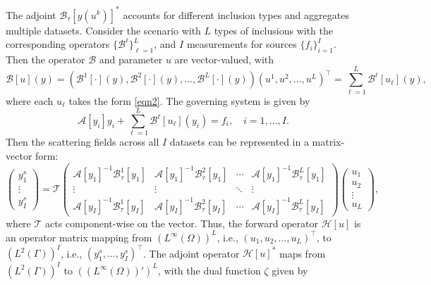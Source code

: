 \documentclass[onefignum,onetabnum]{siamart190516}
\numberwithin{equation}{section}
\begin{document}
The adjoint $\mathcal{B}_{\tau}[y(u^{k})]^{*}$ accounts for different inclusion types and aggregates multiple datasets.
Consider the scenario with $L$ types of inclusions with the corresponding operators $\{\mathcal{B}^{\ell}\}_{\ell=1}^L$, and $I$ measurements for sources $\{f_i\}_{i=1}^I$.
Then the operator $\mathcal{B}$ and parameter $u$ are vector-valued, with
\begin{equation*}
\mathcal{B}[u](y)=(\mathcal{B}^{1}[\cdot](y),\mathcal{B}^{2}[\cdot](y),\dots,\mathcal{B}^{L}[\cdot](y))(u^{1},u^{2},\dots,u^{L})^{\top}=\sum_{\ell=1}^{L} \mathcal{B}^{\ell}[u_{\ell}](y),
\end{equation*}
where each $u_{\ell}$ takes the form \eqref{eqn2}.
The governing system is given by
\begin{equation*}
\mathcal{A}[y_i]y_i + \sum_{\ell=1}^{L} \mathcal{B}^{\ell}[u_{\ell}](y_i) = f_i, \quad i = 1, \dots, I.
\end{equation*}
Then the scattering fields across all $I$ datasets can be represented in a matrix-vector form:
\begin{equation*}
\begin{pmatrix} y^{s}_{1} \\ \vdots \\ y^{s}_{I} \end{pmatrix} = \mathcal{T} \begin{pmatrix}
\mathcal{A}[y_{1}]^{-1}\mathcal{B}^{1}_{\tau}[y_{1}] & \mathcal{A}[y_{1}]^{-1}\mathcal{B}^{2}_{\tau}[y_{1}] & \cdots & \mathcal{A}[y_{1}]^{-1}\mathcal{B}^{L}_{\tau}[y_{1}] \\
\vdots & \vdots & \ddots & \vdots \\
\mathcal{A}[y_{I}]^{-1}\mathcal{B}^{1}_{\tau}[y_{I}] & \mathcal{A}[y_{I}]^{-1}\mathcal{B}^{2}_{\tau}[y_{I}] & \cdots & \mathcal{A}[y_{I}]^{-1}\mathcal{B}^{L}_{\tau}[y_{I}]
\end{pmatrix} \begin{pmatrix} u_{1} \\ u_{2} \\ \vdots \\ u_{L} \end{pmatrix},
\end{equation*}
where $\mathcal{T}$ acts component-wise on the vector.
Thus, the forward operator $\mathcal{H}[u]$ is an operator matrix mapping from $(L^{\infty}(\Omega))^{L}$, i.e., $(u_{1},u_{2},\dots,u_{L})^{\top}$, to $(L^{2}(\Gamma))^{I}$, i.e., $(y^{s}_{1},\dots,y^{s}_{I})^{\top}$.
The adjoint operator $\mathcal{H}[u]^{*}$ maps from $(L^{2}(\Gamma))^{I}$ to $((L^{\infty}(\Omega))')^{L}$, with the dual function $\zeta$ given by
\end{document}
